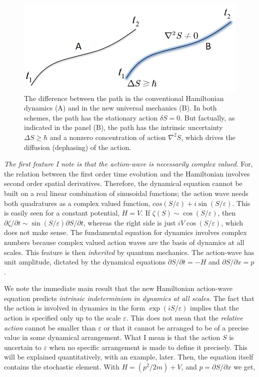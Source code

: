 \begin{figure}[H]
\centering
\includegraphics[scale=0.65]{src/images/chap27/2.jpg}
\caption{The difference between the path in the conventional Hamiltonian dynamics (A) and in
the new universal mechanics (B). In both schemes, the path has the stationary action $\delta S = 0$.
But factually, as indicated in the panel (B), the path has the intrinsic uncertainty $\Delta S \geq \hbar$ and a
nonzero concentration of action $\nabla^2 S$, which drives the diffusion (dephasing) of the action.}\label{ch14-fig2}
\end{figure}

\textit{The first feature I note is that the action-wave is necessarily complex valued}. 
For, the relation between the first order time evolution and the Hamiltonian involves second order spatial
derivatives. Therefore, the dynamical equation cannot be built on a real linear combination of sinusoidal functions; the action wave needs
both quadratures as a complex valued function, $cos(S/\varepsilon) + i \sin(S/\varepsilon)$. This is easily seen for
a constant potential, $H = V$. If $\zeta(S) \sim \cos (S/\varepsilon)$, 
then $\partial \zeta/\partial t \sim \sin (S/\varepsilon) \partial S/\partial t$, 
whereas the right side is just $iV \cos (S/\varepsilon)$, which does not make sense. The fundamental
equation for dynamics involves complex numbers because complex valued action waves are
the basis of dynamics at all scales. This feature is then \textit{inherited} by quantum mechanics.
The action-wave has unit amplitude, dictated by the dynamical equations $\partial S/\partial t = -H$ and
$\partial S/\partial x = p$.

We note the immediate main result that the new Hamiltonian action-wave equation
predicts \textit{intrinsic indeterminism in dynamics at all scales}. The fact that the action is
involved in dynamics in the form $\exp(iS/\varepsilon)$ implies that the action is specified only up to
the scale $\varepsilon$. This does not mean that the \textit{relative action} cannot be smaller than $\varepsilon$ or that it cannot be
arranged to be of a precise value in some dynamical arrangement. What I mean is that the
action $S$ is uncertain to $\varepsilon$ when no specific arrangement is made to define it precisely. This
will be explained quantitatively, with an example, later. Then, the equation itself contains
the stochastic element. With $H = (p^2 /2m) + V$, and $p = \partial S/\partial x$ we get,

